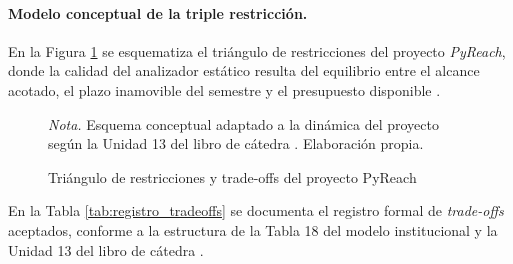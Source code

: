 \paragraph{Modelo conceptual de la triple restricción.}
En la Figura \ref{fig:triangulo_restricciones} se esquematiza el triángulo de restricciones del proyecto \textit{PyReach}, donde la calidad del analizador estático resulta del equilibrio entre el alcance acotado, el plazo inamovible del semestre y el presupuesto disponible \parencite{pmi2021pmbok, torres2026proyecto}. %

\begin{figure}[H]
\centering
{}
\caption{Triángulo de restricciones y trade-offs del proyecto PyReach}
\label{fig:triangulo_restricciones}
\vspace{2pt}
\begin{flushleft}
\scriptsize \textit{Nota.} Esquema conceptual adaptado a la dinámica del proyecto según la Unidad 13 del libro de cátedra \parencite{pmi2021pmbok, torres2026proyecto}. Elaboración propia. %
\end{flushleft}
\end{figure}

En la Tabla \ref{tab:registro_tradeoffs} se documenta el registro formal de \textit{trade-offs} aceptados, conforme a la estructura de la Tabla 18 del modelo institucional y la Unidad 13 del libro de cátedra \parencite{torres2026proyecto}. %

